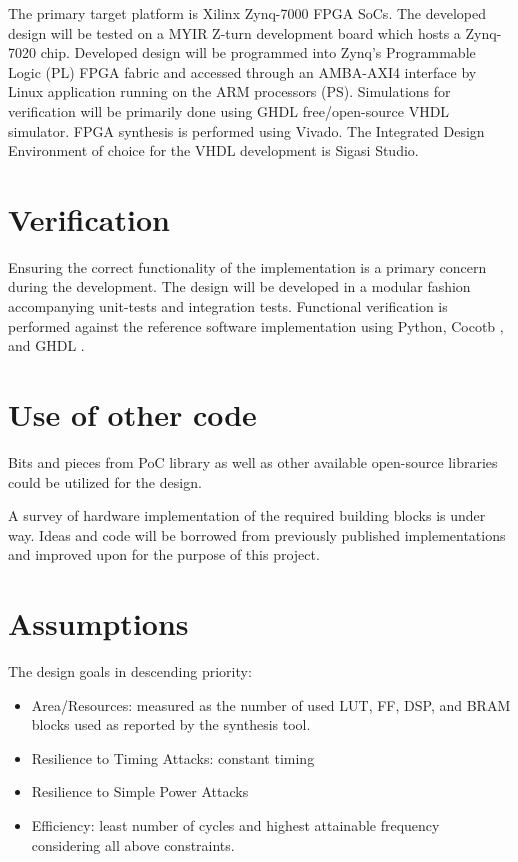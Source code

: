 The primary target platform is Xilinx Zynq-7000 FPGA SoCs. The developed design will be
 tested on a MYIR Z-turn development board which hosts a Zynq-7020 chip. Developed design
  will be programmed into Zynq’s Programmable Logic (PL) FPGA fabric and accessed through 
  an AMBA-AXI4 interface by Linux application running on the ARM processors (PS). 
  Simulations for verification will be primarily done using GHDL free/open-source VHDL
   simulator.  FPGA synthesis is performed using Vivado. The Integrated Design Environment
    of choice for the VHDL development is Sigasi Studio.


\chapter{Verification}
Ensuring the correct functionality of the implementation is a primary concern during the 
development. The design will be developed in a modular fashion accompanying unit-tests 
and integration tests. Functional verification is performed against the reference 
software implementation using Python, Cocotb \cite{cocotb}
 , and GHDL \cite{ghdl}.

 \chapter{Use of other code}

 Bits and pieces from PoC library \cite{poc} as well as other available open-source libraries could be utilized for the design. 


A survey of hardware implementation of the required building blocks is under way. Ideas and code will be borrowed from previously published implementations and improved upon 
 for the purpose of this project.


 \chapter{Assumptions}

 The design goals in descending priority:
 \begin{itemize}
     \item Area/Resources: measured as the number of used LUT, FF, DSP, and BRAM blocks used as reported by the synthesis tool.
     \item Resilience to Timing Attacks: constant timing
     \item Resilience to Simple Power Attacks
     \item Efficiency: least number of cycles and highest attainable frequency considering all above constraints.  
 \end{itemize}

